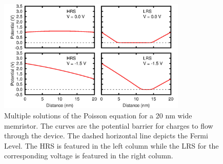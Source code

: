 \begin{center}
  \begin{figure}[h!]
    \begin{center}
      \includegraphics[width=0.8\textwidth]{img/switch-2x2.jpg}    
      \caption{Multiple solutions of the Poisson equation for a 20 nm wide memristor. The curves are the potential barrier for charges to flow through the device. The dashed horizontal line depicts the Fermi Level. The HRS is featured in the left column while the LRS for the corresponding voltage is featured in the right column.} 
      \label{fig:multiple-poisson} 
    \end{center}
  \end{figure}
\end{center}

